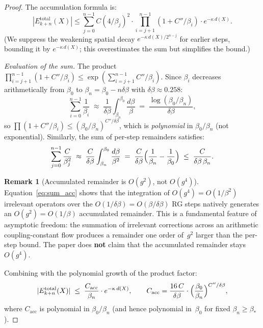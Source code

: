 \documentclass[11pt]{article}
\theoremstyle{definition}
\newtheorem{remark}[theorem]{Remark}
\begin{document}
\begin{proof}
The accumulation formula is:
\begin{equation}\label{eq:acc}
|E_{k+n}^{\mathrm{total}}(X)|\le\sum_{j=0}^{n-1}
C(4/\beta_j)^2\cdot\prod_{i=j+1}^{n-1}(1+C''/\beta_i)
\cdot e^{-\kappa\,d(X)}.
\end{equation}
(We suppress the weakening spatial decay $e^{-\kappa\,d(X)/2^{n-j}}$
for earlier steps, bounding it by $e^{-\kappa\,d(X)}$; this
overestimates the sum but simplifies the bound.)

\smallskip\noindent\emph{Evaluation of the sum.}
The product $\prod_{i=j+1}^{n-1}(1+C''/\beta_i)
\le\exp(\sum_{i=j+1}^{n-1}C''/\beta_i)$.
Since $\beta_i$ decreases arithmetically from $\beta_0$
to $\beta_n=\beta_0-n\delta\beta$ with $\delta\beta\approx 0.258$:
\begin{equation}
\sum_{i=0}^{n-1}\frac{1}{\beta_i}
\;\approx\; \frac{1}{\delta\beta}\int_{\beta_n}^{\beta_0}
\frac{d\beta}{\beta}
\;=\;\frac{\log(\beta_0/\beta_n)}{\delta\beta},
\end{equation}
so $\prod(1+C''/\beta_i)
\le(\beta_0/\beta_n)^{C''/\delta\beta}$, which is
\emph{polynomial} in $\beta_0/\beta_n$ (not exponential).
Similarly, the sum of per-step remainders satisfies:
\begin{equation}\label{eq:sum_acc}
\sum_{j=0}^{n-1}\frac{C}{\beta_j^2}
\;\approx\; \frac{C}{\delta\beta}\int_{\beta_n}^{\beta_0}
\frac{d\beta}{\beta^2}
\;=\;\frac{C}{\delta\beta}
\Bigl(\frac{1}{\beta_n}-\frac{1}{\beta_0}\Bigr)
\;\leq\;\frac{C}{\delta\beta\,\beta_n}.
\end{equation}

\begin{remark}[Accumulated remainder is $O(g^2)$, not $O(g^4)$]
\label{rem:g2_accumulation}
Equation~\eqref{eq:sum_acc} shows that the integration of
$O(g^4)=O(1/\beta^2)$ irrelevant operators over the
$O(1/\delta\beta)=O(\beta/\delta\beta)$ RG steps natively
generates an $O(g^2)=O(1/\beta)$ accumulated remainder.
This is a fundamental feature of asymptotic freedom: the
summation of irrelevant corrections across an arithmetic
coupling-constant flow produces a remainder one order
of~$g^2$ larger than the per-step bound.
The paper does \textbf{not} claim that the accumulated
remainder stays $O(g^4)$.
\end{remark}

Combining with the polynomial growth of the product factor:
\begin{equation}\label{eq:E_acc_corrected}
|E_{k+n}^{\mathrm{total}}(X)|
\;\le\; \frac{C_{\mathrm{acc}}}{\beta_n}\cdot e^{-\kappa\,d(X)},
\qquad
C_{\mathrm{acc}}=\frac{16\,C}{\delta\beta}
\cdot\Bigl(\frac{\beta_0}{\beta_n}\Bigr)^{C''/\delta\beta},
\end{equation}
where $C_{\mathrm{acc}}$ is polynomial in $\beta_0/\beta_n$
(and hence polynomial in~$\beta_0$ for fixed $\beta_n\ge\beta_*$).


\end{proof}
\end{document}
